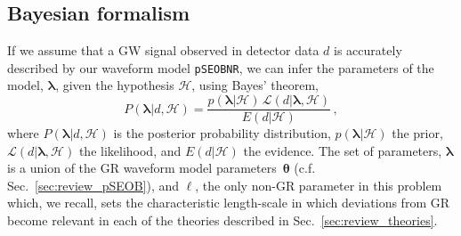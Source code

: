 \documentclass[twocolumn,
               prd,
               aps,
               superscriptaddress,
               tightenlines,
               nofootinbib,
               eqsecnum,
               amsfonts,
               amsmath,
               longbibliography]{revtex4-1}
\newcommand{\pSEOB}{\texttt{pSEOBNR}}
\begin{document}
\subsection{Bayesian formalism}
If we assume that a GW signal observed in detector data $d$ is accurately
described by our waveform model \pSEOB{}, we can infer the parameters of the
model, $\bm{\lambda}$, given the hypothesis $\mathcal{H}$, using Bayes' theorem,
%
\begin{equation}
P(\bm{\lambda} \vert d, \mathcal{H}) =
\frac{p(\bm{\lambda} \vert \mathcal{H}) \, \mathcal{L}(d \vert \bm{\lambda},\mathcal{H})}{E(d \vert \mathcal{H})}\,,
\label{eq:bayes}
\end{equation}
%
where $P(\bm{\lambda} \vert d, \mathcal{H})$ is the posterior probability distribution,
$p(\bm{\lambda} \vert \mathcal{H})$ the prior,
$\mathcal{L}(d \vert \bm{\lambda},\mathcal{H})$ the likelihood, and
$E(d \vert \mathcal{H})$ the evidence.
%
The set of parameters, $\bm{\lambda}$ is a union of the GR waveform
model parameters~$\bm{\theta}$ (c.f.  Sec.~\ref{sec:review_pSEOB}), and
$\ell$,  the only non-GR parameter in this problem which, we recall, sets
the characteristic length-scale in which deviations from
GR become relevant in each of the theories described in
Sec.~\ref{sec:review_theories}. %
%

\end{document}
